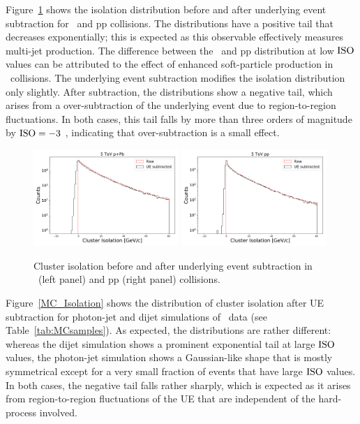 Figure~\ref{fig:iso_ue} shows the isolation distribution before and after underlying event subtraction for \pPb~and pp collisions. The distributions have a positive tail that decreases exponentially; this is expected as this observable effectively measures multi-jet production. The difference between the \pPb~and pp distribution at low $\mathrm{ISO}$ values can be attributed to the effect of enhanced soft-particle production in \pPb~collisions. The underlying event subtraction modifies the isolation distribution only slightly. After subtraction, the distributions show a negative tail, which arises from a over-subtraction of the underlying event due to region-to-region fluctuations. In both cases, this tail falls by more than three orders of magnitude by $\mathrm{ISO}=-3$ \GeVc, indicating that over-subtraction is a small effect.   

\begin{figure}[h]
\center
\includegraphics[width=0.49\textwidth]{Isolation/IsolationWithUESubtraction_Skimmed_13def_root}
\includegraphics[width=0.49\textwidth]{Isolation/IsolationWithUESubtraction_Skimmed_17q_root}
\caption{Cluster isolation before and after underlying event subtraction in \pPb~(left panel) and pp (right panel) collisions.}
\label{fig:iso_ue}
\end{figure}

Figure~\ref{MC_Isolation} shows the distribution of cluster isolation after UE subtraction for photon-jet and dijet simulations of \pPb~data (see Table~\ref{tab:MCsamples}). As expected, the distributions are rather different: whereas the dijet simulation shows a prominent exponential tail at large $\mathrm{ISO}$ values, the photon-jet simulation shows a Gaussian-like shape that is mostly symmetrical except for a very small fraction of events that have large $\mathrm{ISO}$ values. In both cases, the negative tail falls rather sharply, which is expected as it arises from region-to-region fluctuations of the UE that are independent of the hard-process involved. 

